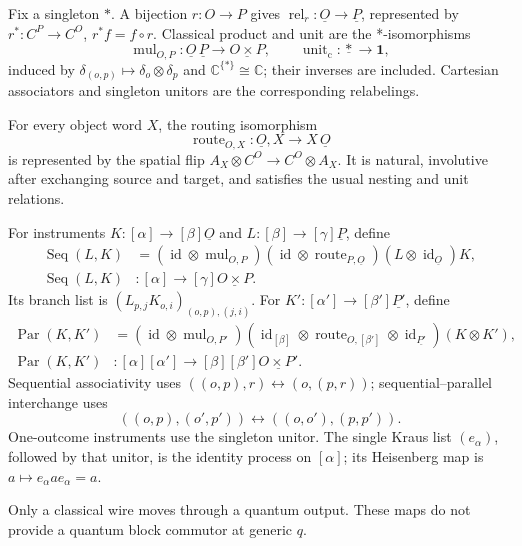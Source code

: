 \begin{definition}
Fix a singleton $*$.  A bijection $r:O\to P$ gives
$\operatorname{rel}_r:\underline O\to\underline P$, represented by
$r^*:C^P\to C^O$, $r^*f=f\circ r$.  Classical product and unit are the
*-isomorphisms
\[
 \operatorname{mul}_{O,P}:\underline O\,\underline P
      \longrightarrow\underline{O\times P},
 \qquad \operatorname{unit}_{\mathrm c}:\underline *\longrightarrow\mathbf1,
\]
induced by $\delta_{(o,p)}\mapsto\delta_o\otimes\delta_p$ and
$\mathbb C^{\{*\}}\cong\mathbb C$; their inverses are included.  Cartesian associators and
singleton unitors are the corresponding relabelings.

For every object word $X$, the routing isomorphism
\[
 \operatorname{route}_{O,X}:\underline O,X\longrightarrow X\,\underline O
\]
is represented by the spatial flip
$A_X\otimes C^O\to C^O\otimes A_X$.  It is natural, involutive after
exchanging source and target, and satisfies the usual nesting and unit
relations.

For instruments $K:[\alpha]\to[\beta]\underline O$ and
$L:[\beta]\to[\gamma]\underline P$, define
\begin{align*}
 \operatorname{Seq}(L,K)
 &= (\operatorname{id}\otimes\operatorname{mul}_{O,P})
    (\operatorname{id}\otimes\operatorname{route}_{P,\underline O})
    (L\otimes\operatorname{id}_{\underline O})K,\\
 \operatorname{Seq}(L,K)&:[\alpha]\to[\gamma]\underline{O\times P}.
\end{align*}
Its branch list is $(L_{p,j}K_{o,i})_{(o,p),(j,i)}$.  For
$K':[\alpha']\to[\beta']\underline{P'}$, define
\begin{align*}
 \operatorname{Par}(K,K')
 &=(\operatorname{id}\otimes\operatorname{mul}_{O,P'})
   (\operatorname{id}_{[\beta]}\otimes
      \operatorname{route}_{O,[\beta']}\otimes
      \operatorname{id}_{\underline{P'}})(K\otimes K'),\\
 \operatorname{Par}(K,K')&:[\alpha][\alpha']
       \to[\beta][\beta']\underline{O\times P'}.
\end{align*}
Sequential associativity uses $((o,p),r)\leftrightarrow(o,(p,r))$;
sequential--parallel interchange uses
\[
 ((o,p),(o',p'))\longleftrightarrow((o,o'),(p,p')).
\]
One-outcome instruments use the singleton unitor. The single Kraus list
$(e_\alpha)$, followed by that unitor, is the identity process on $[\alpha]$;
its Heisenberg map is $a\mapsto e_\alpha a e_\alpha=a$.
\end{definition}
\begin{scope}
Only a classical wire moves through a quantum output.  These maps do not
provide a quantum block commutor at generic $q$.
\end{scope}

